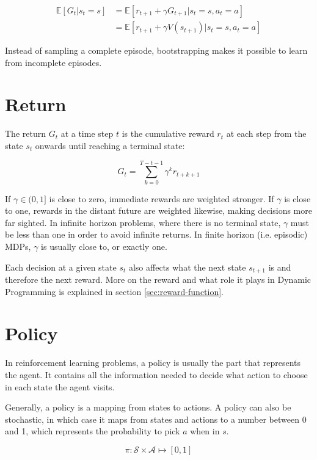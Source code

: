 \begin{align}
\mathbb{E}[G_t|s_t=s] &= \mathbb{E}[r_{t+1} + \gamma G_{t+1}|s_t=s, a_t=a] \\
&=\mathbb{E}[r_{t+1}+ \gamma V(s_{t+1})|s_t=s, a_t=a]
\end{align}

Instead of sampling a complete episode, bootstrapping makes it possible to learn from incomplete episodes.

\section{Return}

The return $G_t$ at a time step $t$ is the cumulative reward $r_t$ at each step from the state $s_t$ onwards until reaching a terminal state:

\begin{equation}
G_t = \sum_{k=0}^{T-t-1}\gamma^k r_{t+k+1}
\end{equation}

If $\gamma \in (0,1]$ is close to zero, immediate rewards are weighted stronger. If $\gamma$ is close to one, rewards in the distant future are weighted likewise, making decisions more far sighted. In infinite horizon problems, where there is no terminal state, $\gamma$ must be less than one in order to avoid infinite returns. In finite horizon (i.e. episodic) MDPs, $\gamma$ is usually close to, or exactly one.

Each decision at a given state $s_t$ also affects what the next state $s_{t+1}$ is and therefore the next reward. More on the reward and what role it plays in Dynamic Programming is explained in section \ref{sec:reward-function}.

\section{Policy}
\label{sec:policy}
In reinforcement learning problems, a policy is usually the part that represents the agent. It contains all the information needed to decide what action to choose in each state the agent visits.

Generally, a policy is a mapping from states to actions. A policy can also be stochastic, in which case it maps from states and actions to a number between 0 and 1, which represents the probability to pick $a$ when in $s$.

\begin{equation}
\pi: \mathcal{S} \times \mathcal{A} \mapsto [0,1]
\end{equation} 


